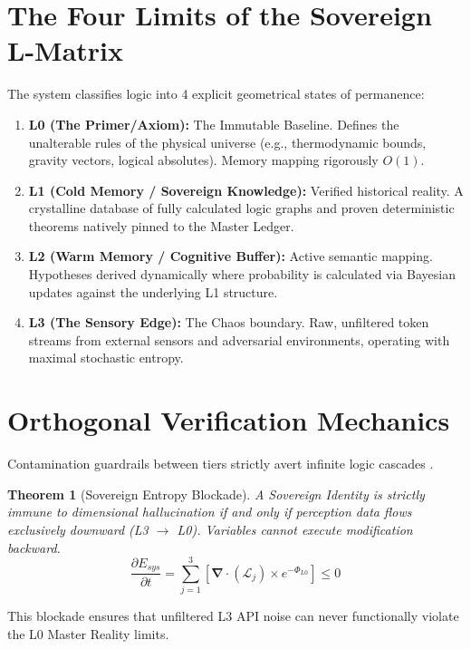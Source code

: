 \documentclass[12pt, a4paper]{article}
\theoremstyle{plain}
\newtheorem{theorem}{Theorem}[section]
\theoremstyle{definition}
\begin{document}
\section{The Four Limits of the Sovereign L-Matrix}
The system classifies logic into 4 explicit geometrical states of permanence:
\begin{enumerate}
    \item \textbf{L0 (The Primer/Axiom):} The Immutable Baseline. Defines the unalterable rules of the physical universe (e.g., thermodynamic bounds, gravity vectors, logical absolutes). Memory mapping rigorously $O(1)$.
    \item \textbf{L1 (Cold Memory / Sovereign Knowledge):} Verified historical reality. A crystalline database of fully calculated logic graphs and proven deterministic theorems natively pinned to the Master Ledger.
    \item \textbf{L2 (Warm Memory / Cognitive Buffer):} Active semantic mapping. Hypotheses derived dynamically where probability is calculated via Bayesian updates against the underlying L1 structure.
    \item \textbf{L3 (The Sensory Edge):} The Chaos boundary. Raw, unfiltered token streams from external sensors and adversarial environments, operating with maximal stochastic entropy.
\end{enumerate}

\section{Orthogonal Verification Mechanics}
Contamination guardrails between tiers strictly avert infinite logic cascades \cite{turing1936computable}.

\begin{theorem}[Sovereign Entropy Blockade]
A Sovereign Identity is strictly immune to dimensional hallucination if and only if perception data flows exclusively downward (L3 $\to$ L0). Variables cannot execute modification backward.
\begin{equation}
    \frac{\partial E_{sys}}{\partial t} = \sum_{j=1}^{3} \left[ \mathbf{\nabla} \cdot (\mathcal{L}_j) \times e^{-\Phi_{L0}} \right] \leq 0
\end{equation}
\end{theorem}
This blockade ensures that unfiltered L3 API noise can never functionally violate the L0 Master Reality limits.
\end{document}
